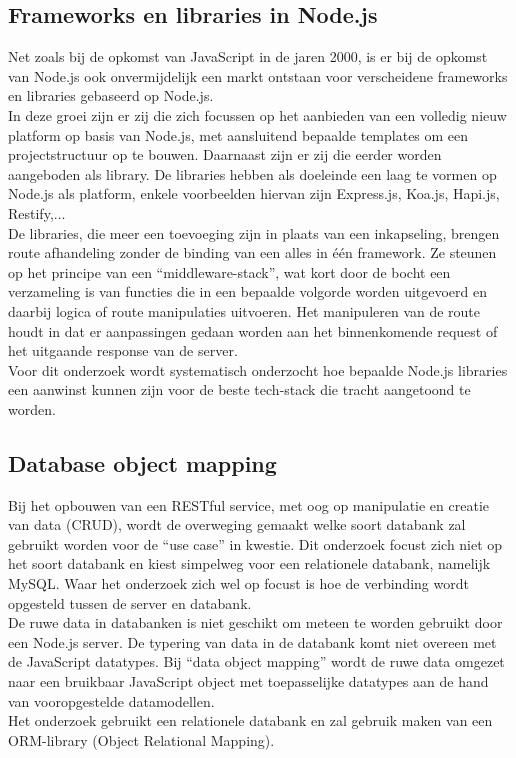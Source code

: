 \subsection{Frameworks en libraries in Node.js}

Net zoals bij de opkomst van JavaScript in de jaren 2000, is er bij de opkomst van Node.js ook onvermijdelijk een markt ontstaan voor verscheidene frameworks en libraries gebaseerd op Node.js. \\ 
In deze groei zijn er zij die zich focussen op het aanbieden van een volledig nieuw platform op basis van Node.js, met aansluitend bepaalde templates om een projectstructuur op te bouwen. Daarnaast zijn er zij die eerder worden aangeboden als library. De libraries hebben als doeleinde een laag te vormen op Node.js als platform, enkele voorbeelden hiervan zijn Express.js, Koa.js, Hapi.js, Restify,$\dots$ \\
De libraries, die meer een toevoeging zijn in plaats van een inkapseling, brengen route afhandeling zonder de binding van een alles in één framework. Ze steunen op het principe van een “middleware-stack”, wat kort door de bocht een verzameling is van functies die in een bepaalde volgorde worden uitgevoerd en daarbij logica of route manipulaties uitvoeren. Het manipuleren van de route houdt in dat er aanpassingen gedaan worden aan het binnenkomende request of het uitgaande response van de server. \\
Voor dit onderzoek wordt systematisch onderzocht hoe bepaalde Node.js libraries een aanwinst kunnen zijn voor de beste tech-stack die tracht aangetoond te worden.

\subsection{Database object mapping}

Bij het opbouwen van een RESTful service, met oog op manipulatie en creatie van data (CRUD), wordt de overweging gemaakt welke soort databank zal gebruikt worden voor de ``use case'' in kwestie. Dit onderzoek focust zich niet op het soort databank en kiest simpelweg voor een relationele databank, namelijk MySQL. Waar het onderzoek zich wel op focust is hoe de verbinding wordt opgesteld tussen de server en databank. \\
De ruwe data in databanken is niet geschikt om meteen te worden gebruikt door een Node.js server. De typering van data in de databank komt niet overeen met de JavaScript datatypes. Bij ``data object mapping'' wordt de ruwe data omgezet naar een bruikbaar JavaScript object met toepasselijke datatypes aan de hand van vooropgestelde datamodellen. \\
Het onderzoek gebruikt een relationele databank en zal gebruik maken van een ORM-library (Object Relational Mapping).

